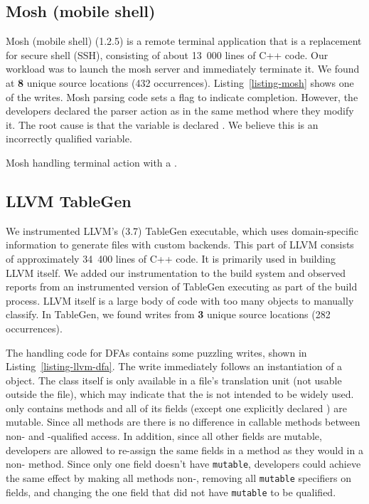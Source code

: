 \subsection{Mosh (mobile shell)}

Mosh (mobile shell) (1.2.5) is a remote terminal application that is a
replacement for secure shell (SSH), consisting of about 13~000 lines of C++
code.
Our workload was to launch the mosh server and immediately terminate it.
We found \wstc{} at {\bf 8} unique source locations (432 occurrences).
Listing~\ref{listing-mosh} shows one of the writes.
Mosh parsing code sets a flag to indicate completion.
However, the developers declared the parser action as \const{} in the same
method where they modify it.
The root cause is that the variable  is declared .
We believe this is an incorrectly \const{} qualified variable.

\begin{listing}[!htb]
  \caption{Mosh handling terminal action with a \wtc{}.}
  \label{listing-mosh}
  \centering
  
\end{listing}

\subsection{LLVM TableGen}

We instrumented LLVM's (3.7) TableGen executable, which uses domain-specific
information to generate files with custom backends.
This part of LLVM consists of approximately 34~400 lines of C++ code.
It is primarily used in building LLVM itself.
We added our instrumentation to the build system and observed reports from an
instrumented version of TableGen executing as part of the build process.
LLVM itself is a large body of code with too many \wstcq{} objects to manually
classify.
In TableGen, we found writes from {\bf 3} unique source locations (282
occurrences).

The handling code for DFAs contains some puzzling writes, shown in
Listing~\ref{listing-llvm-dfa}.
The write immediately follows an instantiation of a  object.
The  class itself is only available in a file's translation unit
(not usable outside the file), which may indicate that the  is not
intended to be widely used.
 only contains \const{} methods and all of its fields (except one
explicitly declared \const{}) are mutable.
Since all methods are \const{} there is no difference in callable methods
between non-\const{} and \const{}-qualified access.
In addition, since all other fields are mutable, developers are allowed to
re-assign the same fields in a \const{} method as they would in a non-\const{}
method.
Since only one field doesn't have \texttt{mutable}, developers could achieve the
same effect by making all methods non-\const{}, removing all \texttt{mutable}
specifiers on fields, and changing the one field that did not have
\texttt{mutable} to be \const{} qualified.

